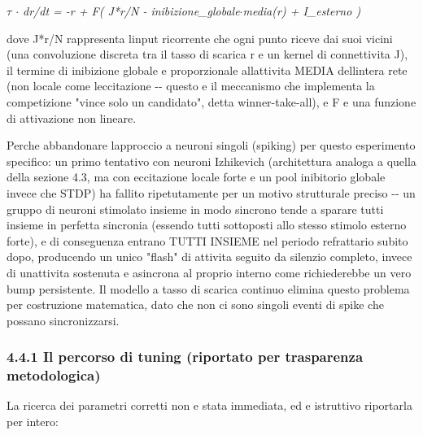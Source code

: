 \documentclass[
  italian,
]{article}
\begin{document}
\emph{$\tau$ $\cdot$ dr/dt = -r + F( J*r/N - inibizione\_\allowbreak{}globale$\cdot$media(r) + I\_\allowbreak{}esterno )}

dove J*r/N rappresenta l\textquotesingle input ricorrente che ogni punto riceve dai suoi vicini (una convoluzione discreta tra il tasso di scarica r e un kernel di connettivita\textquotesingle{} J), il termine di inibizione globale e\textquotesingle{} proporzionale all\textquotesingle attivita\textquotesingle{} MEDIA dell\textquotesingle intera rete (non locale come l\textquotesingle eccitazione -\/- questo e\textquotesingle{} il meccanismo che implementa la competizione "vince solo un candidato", detta winner-take-all), e F e\textquotesingle{} una funzione di attivazione non lineare.

Perche\textquotesingle{} abbandonare l\textquotesingle approccio a neuroni singoli (spiking) per questo esperimento specifico: un primo tentativo con neuroni Izhikevich (architettura analoga a quella della sezione 4.3, ma con eccitazione locale forte e un pool inibitorio globale invece che STDP) ha fallito ripetutamente per un motivo strutturale preciso -\/- un gruppo di neuroni stimolato insieme in modo sincrono tende a sparare tutti insieme in perfetta sincronia (essendo tutti sottoposti allo stesso stimolo esterno forte), e di conseguenza entrano TUTTI INSIEME nel periodo refrattario subito dopo, producendo un unico "flash" di attivita\textquotesingle{} seguito da silenzio completo, invece di un\textquotesingle attivita\textquotesingle{} sostenuta e asincrona al proprio interno come richiederebbe un vero bump persistente. Il modello a tasso di scarica continuo elimina questo problema per costruzione matematica, dato che non ci sono singoli eventi di spike che possano sincronizzarsi.

\subsubsection{4.4.1 Il percorso di tuning (riportato per trasparenza metodologica)}\label{il-percorso-di-tuning-riportato-per-trasparenza-metodologica}

La ricerca dei parametri corretti non e\textquotesingle{} stata immediata, ed e\textquotesingle{} istruttivo riportarla per intero:
\end{document}
